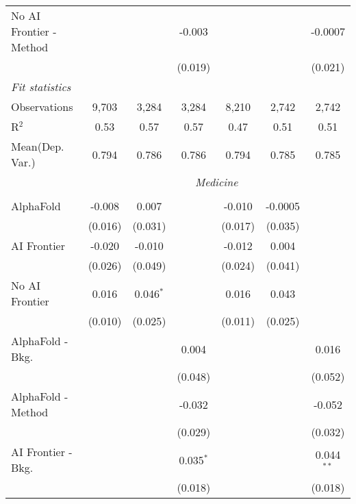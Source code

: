 \begin{tabular}{lcccccc}
   No AI Frontier - Method &                &               & -0.003        &                &               & -0.0007\\   
                           &                &               & (0.019)       &                &               & (0.021)\\   
   \midrule
   \emph{Fit statistics}\\
   Observations            & 9,703          & 3,284         & 3,284         & 8,210          & 2,742         & 2,742\\  
   R$^2$                   & 0.53           & 0.57          & 0.57          & 0.47           & 0.51          & 0.51\\  
   
Mean(Dep. Var.) & 0.794 & 0.786 & 0.786 & 0.794 & 0.785 & 0.785 \\
 & \multicolumn{6}{c}{\textit{Medicine}} \\ \\
   AlphaFold               & -0.008  & 0.007       &              & -0.010  & -0.0005 &   \\   
                           & (0.016) & (0.031)     &              & (0.017) & (0.035) &   \\   
   AI Frontier             & -0.020  & -0.010      &              & -0.012  & 0.004   &   \\   
                           & (0.026) & (0.049)     &              & (0.024) & (0.041) &   \\   
   No AI Frontier          & 0.016   & 0.046$^{*}$ &              & 0.016   & 0.043   &   \\   
                           & (0.010) & (0.025)     &              & (0.011) & (0.025) &   \\   
   AlphaFold - Bkg.        &         &             & 0.004        &         &         & 0.016\\   
                           &         &             & (0.048)      &         &         & (0.052)\\   
   AlphaFold - Method      &         &             & -0.032       &         &         & -0.052\\   
                           &         &             & (0.029)      &         &         & (0.032)\\   
   AI Frontier - Bkg.      &         &             & 0.035$^{*}$  &         &         & 0.044$^{**}$\\   
                           &         &             & (0.018)      &         &         & (0.018)\\   

\end{tabular}
